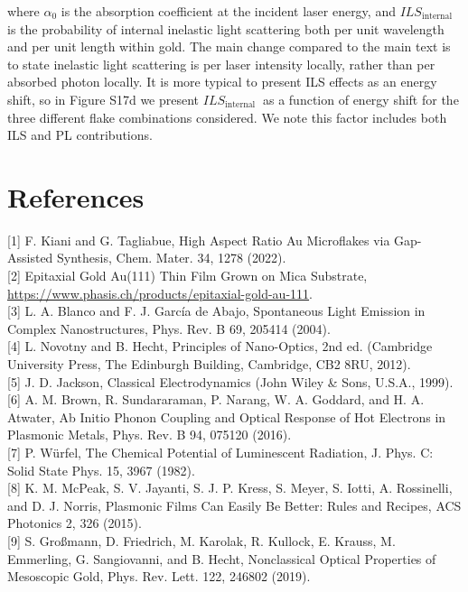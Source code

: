 \documentclass[10pt]{article}
\begin{document}
where $\alpha_{0}$ is the absorption coefficient at the incident laser energy, and $I L S_{\text {internal }}$ is the probability of internal inelastic light scattering both per unit wavelength and per unit length within gold. The main change compared to the main text is to state inelastic light scattering is per laser intensity locally, rather than per absorbed photon locally. It is more typical to present ILS effects as an energy shift, so in Figure S17d we present $I L S_{\text {internal }}$ as a function of energy shift for the three different flake combinations considered. We note this factor includes both ILS and PL contributions.

\section*{References}
[1] F. Kiani and G. Tagliabue, High Aspect Ratio Au Microflakes via Gap-Assisted Synthesis, Chem. Mater. 34, 1278 (2022).\\[0pt]
[2] Epitaxial Gold Au(111) Thin Film Grown on Mica Substrate, \href{https://www.phasis.ch/products/epitaxial-gold-au-111}{https://www.phasis.ch/products/epitaxial-gold-au-111}.\\[0pt]
[3] L. A. Blanco and F. J. García de Abajo, Spontaneous Light Emission in Complex Nanostructures, Phys. Rev. B 69, 205414 (2004).\\[0pt]
[4] L. Novotny and B. Hecht, Principles of Nano-Optics, 2nd ed. (Cambridge University Press, The Edinburgh Building, Cambridge, CB2 8RU, 2012).\\[0pt]
[5] J. D. Jackson, Classical Electrodynamics (John Wiley \& Sons, U.S.A., 1999).\\[0pt]
[6] A. M. Brown, R. Sundararaman, P. Narang, W. A. Goddard, and H. A. Atwater, Ab Initio Phonon Coupling and Optical Response of Hot Electrons in Plasmonic Metals, Phys. Rev. B 94, 075120 (2016).\\[0pt]
[7] P. Würfel, The Chemical Potential of Luminescent Radiation, J. Phys. C: Solid State Phys. 15, 3967 (1982).\\[0pt]
[8] K. M. McPeak, S. V. Jayanti, S. J. P. Kress, S. Meyer, S. Iotti, A. Rossinelli, and D. J. Norris, Plasmonic Films Can Easily Be Better: Rules and Recipes, ACS Photonics 2, 326 (2015).\\[0pt]
[9] S. Großmann, D. Friedrich, M. Karolak, R. Kullock, E. Krauss, M. Emmerling, G. Sangiovanni, and B. Hecht, Nonclassical Optical Properties of Mesoscopic Gold, Phys. Rev. Lett. 122, 246802 (2019).\\[0pt]
\end{document}
